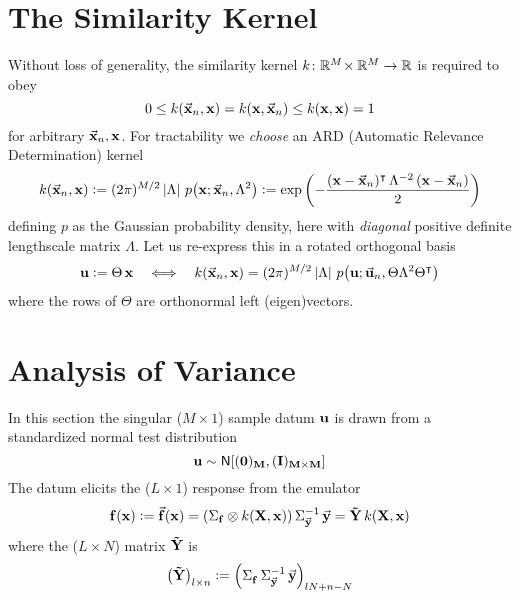 \documentclass[a4paper, margin=1in, reqno]{RAMArticle}
\begin{document}
\section{The Similarity Kernel}
	Without loss of generality, the similarity kernel \( k \colon \mathbb{R}^M \! \times \mathbb{R}^M \to \mathbb{R}\) is required to obey
	\begin{equation*}
		0 \leq k(\vec{\mathbf{x}}_{n},\mathbf{x}) = k(\mathbf{x},\vec{\mathbf{x}}_{n}) \leq k(\mathbf{x},\mathbf{x}) = 1
	\end{equation*}
	for arbitrary \(\vec{\mathbf{x}}_{n},\mathbf{x}\). For tractability we \textit{choose} an ARD (Automatic Relevance Determination) kernel
	\begin{equation*}
		k(\vec{\mathbf{x}}_{n},\mathbf{x}) \mathrel{\mathop:}= 
			(2 \pi)^{M/2} \left\lvert\Lambda\right\rvert \, p\!\left(\mathbf{x} ; \vec{\mathbf{x}}_{n}, \Lambda^2\right) 
		\mathrel{\mathop:}= \exp\left(-\frac
			{(\mathbf{x}-\vec{\mathbf{x}}_{n})^{\intercal}\, \Lambda^{-2} \,(\mathbf{x}-\vec{\mathbf{x}}_{n})}
			{2}
		\right) 
	\end{equation*}
	defining \(p\) as the Gaussian probability density, here with \emph{diagonal} positive definite lengthscale matrix \(\Lambda\).
	Let us re-express this in a rotated orthogonal basis
	\begin{equation*}
		\mathbf{u} \mathrel{\mathop:}= \Theta \, \mathbf{x} 
			\quad \Longleftrightarrow \quad 
			k(\vec{\mathbf{x}}_{n},\mathbf{x}) = 
			(2 \pi)^{M/2} \left\lvert\Lambda\right\rvert \, 
			p\!\left(\mathbf{u} ; \vec{\mathbf{u}}_{n}, \Theta\Lambda^{2}\Theta^{\intercal}\right)
	\end{equation*}
	where the rows of \(\Theta\) are orthonormal left (eigen)vectors.


\section{Analysis of Variance}
	In this section the singular (\(M\times 1\)) sample datum \(\mathbf{u}\) is drawn from a standardized normal test distribution
	\begin{equation*}
		\mathbf{u} \sim \mathsf{N}\lbrack (\mathbf{0})_{\mathbf{M}},(\mathbf{I})_{\mathbf{M}\times\mathbf{M}}\rbrack
	\end{equation*}
	The datum elicits the (\(L\times 1\)) response from the emulator
	\begin{equation*}
		\mathbf{f}(\mathbf{x}) \mathrel{\mathop:}= \vec{\mathbf{f}}(\mathbf{x})
		 = \left(\Sigma_{\mathbf{f}} \otimes k(\mathbf{X}, \mathbf{x})\right) \Sigma_{\vec{\mathbf{y}}}^{-1} \, \vec{\mathbf{y}}
		 = \mathbf{\tilde{Y}} \, k(\mathbf{X}, \mathbf{x})
	\end{equation*}
	where the (\(L\times N\)) matrix \(\mathbf{\tilde{Y}}\) is
	\begin{equation*}
		\left(\mathbf{\tilde{Y}}\right)_{l \times n} \mathrel{\mathop:}= \left(\Sigma_{\mathbf{f}}^{\phantom{1}}\, \Sigma_{\vec{\mathbf{y}}}^{-1} \, \vec{\mathbf{y}}\right)_{lN+n-N}
	\end{equation*}
\end{document}
